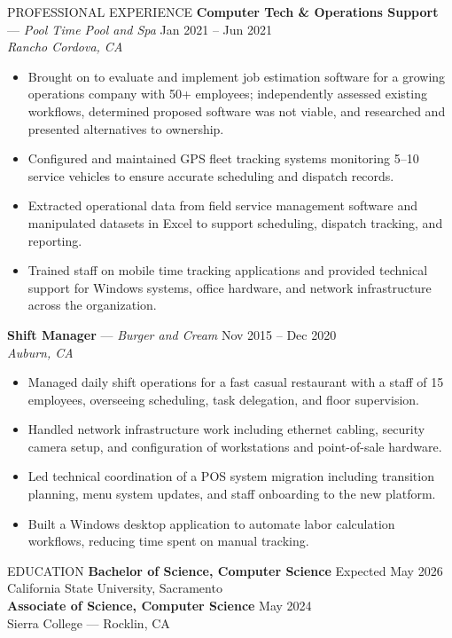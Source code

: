 \documentclass{resume}
\begin{document}
\begin{rSection}{PROFESSIONAL EXPERIENCE}
\textbf{Computer Tech \& Operations Support} --- \textit{Pool Time Pool and Spa} \hfill Jan 2021 -- Jun 2021 \\
\textit{Rancho Cordova, CA}
\begin{itemize}
    \item Brought on to evaluate and implement job estimation software for a growing operations company with 50+ employees; independently assessed existing workflows, determined proposed software was not viable, and researched and presented alternatives to ownership.
    \item Configured and maintained GPS fleet tracking systems monitoring 5--10 service vehicles to ensure accurate scheduling and dispatch records.
    \item Extracted operational data from field service management software and manipulated datasets in Excel to support scheduling, dispatch tracking, and reporting.
    \item Trained staff on mobile time tracking applications and provided technical support for Windows systems, office hardware, and network infrastructure across the organization.
\end{itemize}

\textbf{Shift Manager} --- \textit{Burger and Cream} \hfill Nov 2015 -- Dec 2020 \\
\textit{Auburn, CA}
\begin{itemize}
    \item Managed daily shift operations for a fast casual restaurant with a staff of 15 employees, overseeing scheduling, task delegation, and floor supervision.
    \item Handled network infrastructure work including ethernet cabling, security camera setup, and configuration of workstations and point-of-sale hardware.
    \item Led technical coordination of a POS system migration including transition planning, menu system updates, and staff onboarding to the new platform.
    \item Built a Windows desktop application to automate labor calculation workflows, reducing time spent on manual tracking.
\end{itemize}

\end{rSection}


\begin{rSection}{EDUCATION}
\textbf{Bachelor of Science, Computer Science} \hfill Expected May 2026 \\
California State University, Sacramento \\

\textbf{Associate of Science, Computer Science} \hfill May 2024 \\
Sierra College --- Rocklin, CA
\end{rSection}
\end{document}

